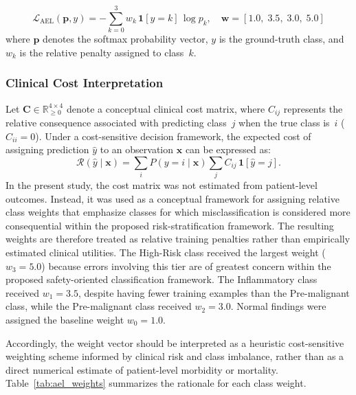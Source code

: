 \documentclass[11pt,a4paper]{article}
\begin{document}
\begin{equation}
  \mathcal{L}_{\text{AEL}}(\mathbf{p}, y) =
    -\sum_{k=0}^{3} w_k\,\mathbf{1}[y=k]\,\log p_k, \quad
  \mathbf{w} = [1.0,\; 3.5,\; 3.0,\; 5.0]
  \label{eq:ael}
\end{equation}
where $\mathbf{p}$ denotes the softmax probability vector, $y$ is the
ground-truth class, and $w_k$ is the relative penalty assigned to class~$k$.

\subsubsection*{Clinical Cost Interpretation}

Let $\mathbf{C} \in \mathbb{R}_{\geq 0}^{4\times4}$ denote a conceptual
clinical cost matrix, where $C_{ij}$ represents the relative consequence
associated with predicting class~$j$ when the true class is~$i$
($C_{ii}=0$). Under a cost-sensitive decision framework, the expected cost
of assigning prediction $\hat{y}$ to an observation $\mathbf{x}$ can be
expressed as:
\begin{equation}
  \mathcal{R}(\hat{y} \mid \mathbf{x})
    = \sum_{i} P(y{=}i \mid \mathbf{x})
      \sum_{j} C_{ij}\,\mathbf{1}[\hat{y}{=}j].
  \label{eq:bayes_cost}
\end{equation}
In the present study, the cost matrix was not estimated from patient-level
outcomes. Instead, it was used as a conceptual framework for assigning
relative class weights that emphasize classes for which misclassification is
considered more consequential within the proposed risk-stratification
framework. The resulting weights are therefore treated as
relative training penalties rather than empirically estimated
clinical utilities. The High-Risk class received the largest weight
($w_3=5.0$) because errors involving this tier are of greatest concern
within the proposed safety-oriented classification framework.
The Inflammatory class received $w_1=3.5$, despite having fewer training
examples than the Pre-malignant class, while the Pre-malignant class
received $w_2=3.0$. Normal findings were assigned the baseline weight
$w_0=1.0$.

Accordingly, the weight vector should be interpreted as a
heuristic cost-sensitive weighting scheme informed by clinical risk
and class imbalance, rather than as a direct numerical estimate of
patient-level morbidity or mortality. Table~\ref{tab:ael_weights} summarizes
the rationale for each class weight.
\end{document}
